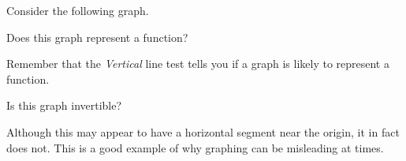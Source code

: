 \documentclass{ximera}
\begin{document}
\begin{problem}
    Consider the following graph.
    \begin{center}
    \end{center}
    
    Does this graph represent a function?
    \begin{multipleChoice}
    \end{multipleChoice}
    \begin{feedback}
        Remember that the \textit{Vertical} line test tells you if a graph is likely to represent a function.
    \end{feedback}
    
    \begin{problem}
        Is this graph invertible?
        \begin{multipleChoice}
        \end{multipleChoice}
        \begin{feedback}
            Although this may appear to have a horizontal segment near the origin, it in fact does not. This is a good example of why graphing can be misleading at times.
        \end{feedback}
    \end{problem}
\end{problem}
\end{document}
